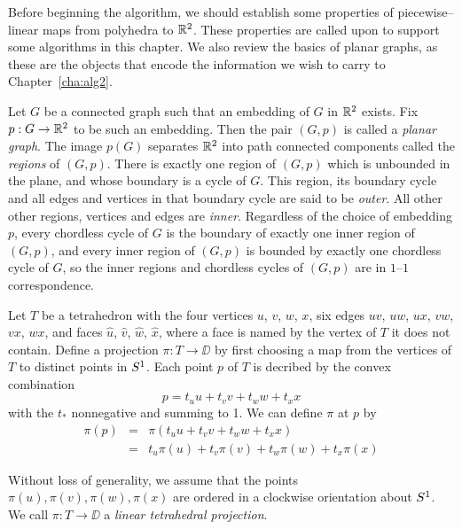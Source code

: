 \label{def:preliminaries}
Before beginning the algorithm, we should establish some properties of piecewise--linear maps from polyhedra to $\mathbb{R}^2$.
These properties are called upon to support some algorithms in this chapter.
We also review the basics of planar graphs, as these are the objects that encode the information we wish to carry to Chapter~\ref{cha:alg2}.

\begin{defn}
	\label{def:planargraph}
	Let $G$ be a connected graph such that an embedding of $G$ in $\mathbb{R}^2$ exists.
	Fix $p:G\to\mathbb{R}^2$ to be such an embedding.
	Then the pair $(G,p)$ is called a \emph{planar graph}.
	The image $p(G)$ separates $\mathbb{R}^2$ into path connected components called the \emph{regions} of $(G,p)$.
	There is exactly one region of $(G,p)$ which is unbounded in the plane, and whose boundary is a cycle of $G$.
	This region, its boundary cycle and all edges and vertices in that boundary cycle are said to be \emph{outer}.
	All other other regions, vertices and edges are \emph{inner}.
	Regardless of the choice of embedding $p$, every chordless cycle of $G$ is the boundary of exactly one inner region of $(G,p)$, and every inner region of $(G,p)$ is bounded by exactly one chordless cycle of $G$, so the inner regions and chordless cycles of $(G,p)$ are in $1$--$1$ correspondence.
\end{defn}

\begin{defn}
	\label{def:stdproj}
	Let $T$ be a tetrahedron with the four vertices $u$, $v$, $w$, $x$, six edges $uv$, $uw$, $ux$, $vw$, $vx$, $wx$, and faces $\hat{u}$, $\hat{v}$, $\hat{w}$, $\hat{x}$, where a face is named by the vertex of $T$ it does not contain.
	Define a projection $\pi: T \to\DD$ by first choosing a map from the vertices of $T$ to distinct points in $S^1$.
	Each point $p$ of $T$ is decribed by the convex combination
	\[
		p = t_u u + t_v v + t_w w + t_x x
	\]
	with the $t_*$ nonnegative and summing to 1.
	We can define $\pi$ at $p$ by
	\begin{eqnarray}
		\label{affine_extension}
		\pi(p)
		&=&
		\pi(t_u u + t_v v + t_w w + t_x x) \nonumber \\
		&=&
		t_u \pi(u) + t_v \pi(v) + t_w \pi(w) + t_x \pi(x)
	\end{eqnarray}
	  
	Without loss of generality, we assume that the points $\pi(u),\pi(v),\pi(w),\pi(x)$ are ordered in a clockwise orientation about $S^1$.
	We call $\pi:T\to\DD$ a \emph{linear tetrahedral projection}.
\end{defn}


